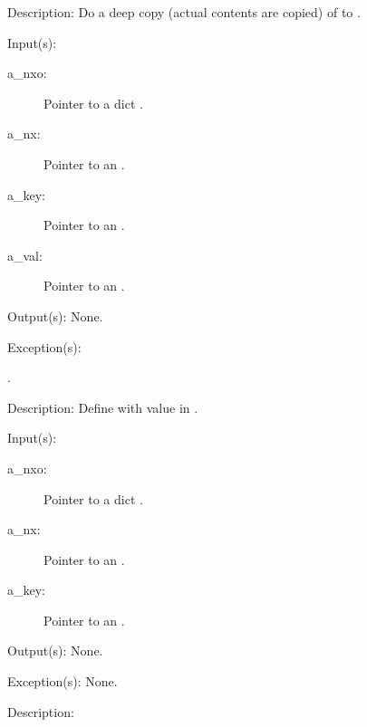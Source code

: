 \begin{capi}
\begin{capilist}
\begin{description}
		\end{description}
	\item[Description: ]
		Do a deep copy (actual contents are copied) of  to
		.
	\end{capilist}
\label{nxo_dict_def}
	\begin{capilist}
	\item[Input(s): ]
		\begin{description}\item[]
		\item[a\_nxo: ]
			Pointer to a dict .
		\item[a\_nx: ]
			Pointer to an .
		\item[a\_key: ]
			Pointer to an .
		\item[a\_val: ]
			Pointer to an .
		\end{description}
	\item[Output(s): ] None.
	\item[Exception(s): ]
		\begin{description}\item[]
		\item[.]
		\end{description}
	\item[Description: ]
		Define  with value  in .
	\end{capilist}
\label{nxo_dict_undef}
	\begin{capilist}
	\item[Input(s): ]
		\begin{description}\item[]
		\item[a\_nxo: ]
			Pointer to a dict \classname{nxo}.
		\item[a\_nx: ]
			Pointer to an \classname{nx}.
		\item[a\_key: ]
			Pointer to an \classname{nxo}.
		\end{description}
	\item[Output(s): ] None.
	\item[Exception(s): ] None.
	\item[Description: ]

\end{capilist}
\end{capi}
